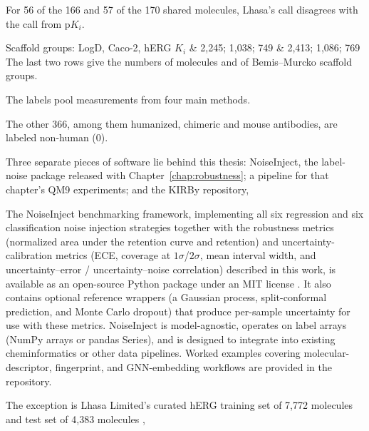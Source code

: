 For 56 of the 166 and 57 of the 170 shared molecules, Lhasa's call disagrees with the call from p$K_i$.

Scaffold groups: LogD, Caco-2, hERG $K_i$ & 2,245; 1,038; 749 & 2,413; 1,086; 769 \\

The last two rows give the numbers of molecules and of Bemis--Murcko scaffold groups.

The labels pool measurements from four main methods.

The other 366, among them humanized, chimeric and mouse antibodies, are labeled non-human (0).

Three separate pieces of software lie behind this thesis: NoiseInject, the label-noise package released with Chapter~\ref{chap:robustness}; a pipeline for that chapter's QM9 experiments; and the KIRBy repository,

The NoiseInject benchmarking framework, implementing all six regression and six classification noise injection strategies together with the robustness metrics (normalized area under the retention curve and retention) and uncertainty-calibration metrics (ECE, coverage at $1\sigma$/$2\sigma$, mean interval width, and uncertainty--error / uncertainty--noise correlation) described in this work, is available as an open-source Python package under an MIT license \citep{noiseinject}. It also contains optional reference wrappers (a Gaussian process, split-conformal prediction, and Monte Carlo dropout) that produce per-sample uncertainty for use with these metrics. NoiseInject is model-agnostic, operates on label arrays (NumPy arrays or pandas Series), and is designed to integrate into existing cheminformatics or other data pipelines. Worked examples covering molecular-descriptor, fingerprint, and GNN-embedding workflows are provided in the repository.


The exception is Lhasa Limited's curated hERG training set of 7,772 molecules and test set of 4,383 molecules \citep{Hanser2025},
